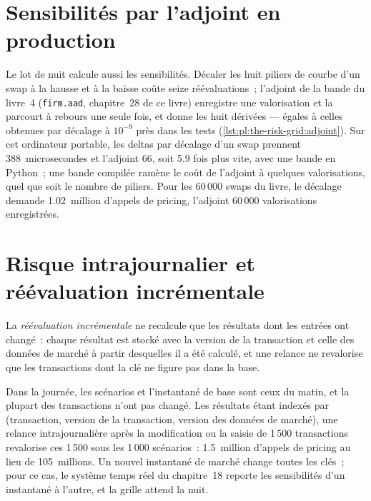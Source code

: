 \section{Sensibilités par l'adjoint en production}

Le lot de nuit calcule aussi les sensibilités. Décaler les huit piliers de courbe d'un swap à la hausse et à la baisse coûte seize réévaluations~; l'adjoint de
la bande du livre~4 (\texttt{firm.aad}, chapitre~28 de ce livre) enregistre une valorisation et la parcourt à rebours une seule fois, et donne les huit dérivées --- égales à celles obtenues par décalage
à $10^{-9}$ près dans les tests (\cref{lst:pl:the-risk-grid:adjoint}). Sur cet ordinateur portable, les deltas par décalage d'un swap prennent 388~microsecondes
et l'adjoint 66, soit 5.9 fois plus vite, avec une bande en Python~; une bande compilée ramène le coût de l'adjoint à quelques valorisations, quel que soit le nombre
de piliers. Pour les 60\,000 swaps du livre, le décalage demande 1.02~million d'appels de pricing, l'adjoint 60\,000 valorisations enregistrées.

\label{lst:pl:the-risk-grid:adjoint}

\section{Risque intrajournalier et réévaluation incrémentale}

\begin{definition}\label{def:pl:the-risk-grid:incremental}
La \emph{réévaluation incrémentale} ne recalcule que les résultats dont les entrées ont changé~: chaque résultat est stocké avec la
version de la transaction et celle des données de marché à partir desquelles il a été calculé, et une relance ne revalorise que les transactions dont la clé ne figure pas dans la base.
\end{definition}

Dans la journée, les scénarios et l'instantané de base sont ceux du matin, et la plupart des transactions n'ont pas changé. Les résultats étant indexés par (transaction, version de la transaction,
version des données de marché), une relance intrajournalière après la modification ou la saisie de 1\,500 transactions revalorise ces 1\,500 sous les 1\,000 scénarios~:
1.5~million d'appels de pricing au lieu de 105~millions. Un nouvel instantané de marché change toutes les clés~; pour ce cas, le système temps réel du chapitre~18 reporte les sensibilités
d'un instantané à l'autre, et la grille attend la nuit.

